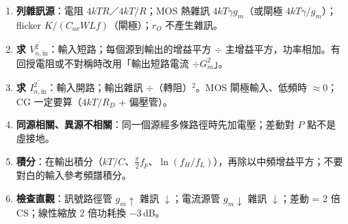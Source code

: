 \documentclass[11pt,a4paper]{article}
\newcommand{\Vsq}[1]{\overline{V^2_{n,\text{#1}}}}
\newcommand{\Isq}[1]{\overline{I^2_{n,\text{#1}}}}
\begin{document}
\begin{recipebox}[解題流程總整理]
\begin{enumerate}[leftmargin=2.2em]
  \item \textbf{列雜訊源}：電阻 $4kTR$／$4kT/R$；MOS 熱雜訊 $4kT\gamma g_m$（或閘極 $4kT\gamma/g_m$）；flicker $K/(C_{ox}WLf)$（閘極）；$r_O$ 不產生雜訊。
  \item \textbf{求 $\Vsq{in}$}：輸入短路；每個源到輸出的增益平方 $\div$ 主增益平方，功率相加。有回授電阻或不對稱時改用「輸出短路電流 $\div G_m^2$」。
  \item \textbf{求 $\Isq{in}$}：輸入開路；輸出雜訊 $\div$（轉阻）$^2$。MOS 閘極輸入、低頻時 $\approx0$；CG 一定要算（$4kT/R_D$ + 偏壓管）。
  \item \textbf{同源相關、異源不相關}：同一個源經多條路徑時先加電壓；差動對 $P$ 點不是虛接地。
  \item \textbf{積分}：在輸出積分（$kT/C$、$\frac{\pi}{2}f_p$、$\ln(f_H/f_L)$），再除以中頻增益平方；不要對白的輸入參考頻譜積分。
  \item \textbf{檢查直觀}：訊號路徑管 $g_m\uparrow$ 雜訊 $\downarrow$；電流源管 $g_m\downarrow$ 雜訊 $\downarrow$；差動 = 2 倍 CS；線性縮放 2 倍功耗換 $-3$\,dB。
\end{enumerate}
\end{recipebox}
\end{document}

